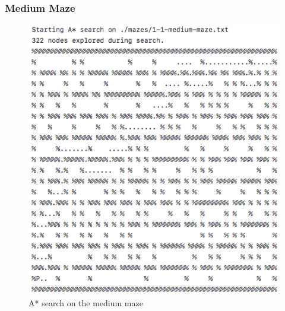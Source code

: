 \documentclass[titlepage]{article}
\begin{document}
\subsubsection{Medium Maze}
\begin{figure}[h!]
\includegraphics[width=\linewidth]{astarmedium.png}
\caption{A* search on the medium maze}
\label{fig:ASTARmedium}
\end{figure}

\newpage
\end{document}
